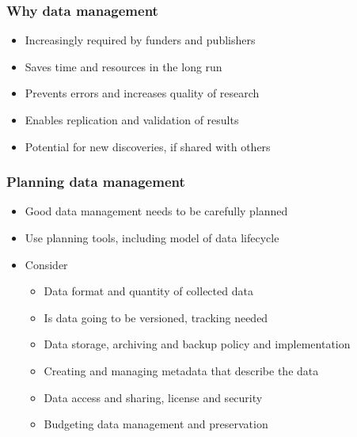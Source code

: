 \documentclass{beamer}
\begin{document}
\begin{frame}
  \frametitle{Why data management}
  
  \begin{itemize}
    \item Increasingly required by funders and publishers
    \item Saves time and resources in the long run
    \item Prevents errors and increases quality of research
    \item Enables replication and validation of results
    \item Potential for new discoveries, if shared with others
  \end{itemize}
\end{frame}

\begin{frame}
  \frametitle{Planning data management}
  
  \begin{itemize}
  \item Good data management needs to be carefully planned
  \item Use planning tools, including model of data lifecycle
  \item Consider
  \begin{itemize}
    \item Data format and quantity of collected data
    \item Is data going to be versioned, tracking needed
    \item Data storage, archiving and backup policy and implementation
    \item Creating and managing metadata that describe the data
    \item Data access and sharing, license and security
    \item Budgeting data management and preservation
  \end{itemize}
  \end{itemize}
\end{frame}
\end{document}
